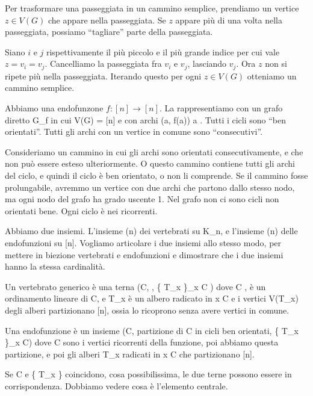 Per trasformare una passeggiata in un cammino semplice, prendiamo un vertice $z \in V(G)$ che appare nella passeggiata.
Se $z$ appare pi\`u di una volta nella passeggiata, possiamo ``tagliare'' parte della passeggiata.

Siano $i$ e $j$ rispettivamente il pi\`u piccolo e il pi\`u grande indice per cui vale $z = v_i = v_j$.
Cancelliamo la passeggiata fra $v_i$ e $v_j$, lasciando $v_j$.
Ora $z$ non si ripete pi\`u nella passeggiata.
Iterando questo per ogni $z \in V(G)$ otteniamo un cammino semplice.




Abbiamo una endofunzone $f : [n] \to [n]$.
La rappresentiamo con un grafo diretto G_f in cui V(G) = [n] e con archi (a, f(a)) \forall a \in [n].
Tutti i cicli sono ``ben orientati''.
Tutti gli archi con un vertice in comune sono ``consecutivi''.

Consideriamo un cammino in cui gli archi sono orientati consecutivamente, e che non pu\`o essere esteso ulteriormente.
O questo cammino contiene tutti gli archi del ciclo, e quindi il ciclo \`e ben orientato, o non li comprende.
Se il cammino fosse prolungabile, avremmo un vertice con due archi che partono dallo stesso nodo, ma ogni nodo del grafo ha grado uscente 1.
Nel grafo non ci sono cicli non orientati bene.
Ogni ciclo \`e nei ricorrenti.

Abbiamo due insiemi.
L'insieme (n) dei vertebrati su K_n, e l'insieme (n) delle endofunzioni su [n].
Vogliamo articolare i due insiemi allo stesso modo, per mettere in biezione vertebrati e endofunzioni e dimostrare che i due insiemi hanno
la stessa cardinalit\`a.

Un vertebrato generico \`e una terna (C, , \{ T_x \}_{x \in C} ) dove C \subseteq [n],  \`e un ordinamento lineare di C, e T_x \`e un albero radicato in x \in C e i vertici V(T_x) degli alberi partizionano [n], ossia lo ricoprono senza avere vertici in comune.

Una endofunzione \`e un insieme (C, partizione di C in cicli ben orientati, \{ T_x \}_{x \in C}) dove C \subseteq [n] sono i vertici ricorrenti della funzione, poi abbiamo questa partizione, e poi gli alberi T_x radicati in x \in C che partizionano [n].

Se C e \{ T_x \} coincidono, cosa possibilissima, le due terne possono essere in corrispondenza.
Dobbiamo vedere cosa \`e l'elemento centrale.

